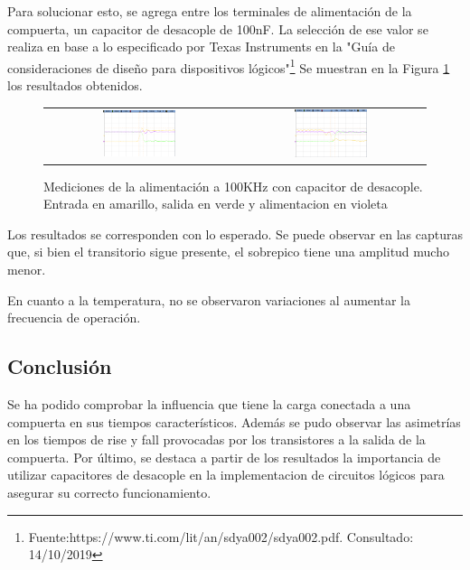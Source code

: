 Para solucionar esto, se agrega entre los terminales de alimentaci\'on de la compuerta, un capacitor de desacople de 100nF. La selecci\'on de ese valor se realiza en base a lo especificado por Texas Instruments en la "Gu\'ia de consideraciones de dise\~no para dispositivos l\'ogicos"\footnote{Fuente:https://www.ti.com/lit/an/sdya002/sdya002.pdf. Consultado: 14/10/2019}
Se muestran en la Figura \ref{fig:DC_CAP} los resultados obtenidos.
\begin{figure}[H]
    \centering
    \begin{tabular}{c c}
        \includegraphics[width=0.4\textwidth]{../EJ4/Recursos/DC_VAR_FALL_CAP} &
        \includegraphics[width=0.4\textwidth]{../EJ4/Recursos/DC_VAR_RISE_CAP}
    \end{tabular}
    \caption{Mediciones de la alimentaci\'on a 100KHz con capacitor de desacople. Entrada en amarillo, salida en verde y alimentacion en violeta}
    \label{fig:DC_CAP}
\end{figure}

Los resultados se corresponden con lo esperado. Se puede observar en las capturas que, si bien el transitorio sigue presente, el sobrepico tiene una amplitud mucho menor.  

En cuanto a la temperatura, no se observaron variaciones al aumentar la frecuencia de operaci\'on.

\subsection{Conclusi\'on}
Se ha podido comprobar la influencia que tiene la carga conectada a una compuerta en sus tiempos caracter\'isticos. Adem\'as se pudo observar las asimetr\'ias en los tiempos de rise y fall provocadas por los transistores a la salida de la compuerta.
Por \'ultimo, se destaca a partir de los resultados la importancia de utilizar capacitores de desacople en la implementacion de circuitos l\'ogicos para asegurar su correcto funcionamiento.
